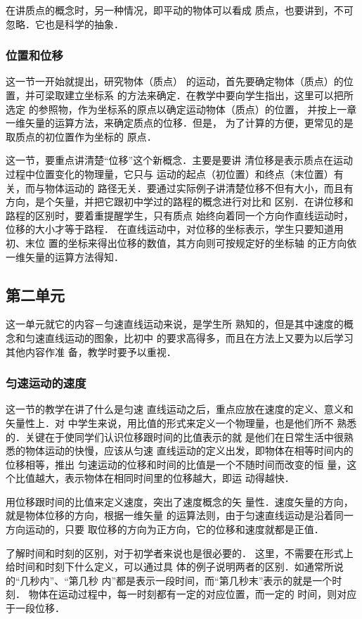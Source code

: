 在讲质点的概念时，另一种情况，即平动的物体可以看成
质点，也要讲到，不可忽略．它也是科学的抽象．

\subsubsection{位置和位移}
 这一节一开始就提出，研究物体（质点）
的运动，首先要确定物体（质点）的位置，并可梁取建立坐标系
的方法来确定．在教学中要向学生指出，这里可以把所选定
的参照物，作为坐标系的原点以确定运动物体（质点）的位置，
并按上一章一维矢量的运算方法，来确定质点的位移．但是，
为了计算的方便，更常见的是取质点的初位置作为坐标的
原点．

这一节，要重点讲清楚“位移”这个新概念．主要是要讲
清位移是表示质点在运动过程中位置变化的物理量，它只与
运动的起点（初位置）和终点（末位置）有关，而与物体运动的
路径无关．要通过实际例子讲清楚位移不但有大小，而且有
方向，是个矢量，并把它跟初中学过的路程的概念进行对比和
区别．在讲位移和路程的区别时，要着重提醒学生，只有质点
始终向着同一个方向作直线运动时，位移的大小才等于路程．
在直线运动中，对位移的坐标表示，学生只要知道用初、末位
置的坐标来得出位移的数值，其方向则可按规定好的坐标轴
的正方向依一维矢量的运算方法得知．

\subsection{第二单元}
这一单元就它的内容－匀速直线运动来说，是学生所
熟知的，但是其中速度的概念和匀速直线运动的图象，比初中
的要求高得多，而且在方法上又要为以后学习其他内容作准
备，教学时要予以重视．

\subsubsection{匀速运动的速度}

这一节的教学在讲了什么是匀速
直线运动之后，重点应放在速度的定义、意义和矢量性上．对
中学生来说，用比值的形式来定义一个物理量，也是他们所不
熟悉的．关键在于使同学们认识位移跟时间的比值表示的就
是他们在日常生活中很熟悉的物体运动的快慢，应该从匀速
直线运动的定义出发，即物体在相等时间内的位移相等，推出
匀速运动的位移和时间的比值是一个不随时间而改变的恒
量，这个比值越大，表示物体在相同时间里的位移越大，即运
动得越快．

用位移跟时间的比值来定义速度，突出了速度概念的矢
量性．速度矢量的方向，就是物体位移的方向，根据一维矢量
的运算法则，由于匀速直线运动是沿着同一方向运动的，只要
取位移的方向为正方向，它的位移和速度就都是正值．

了解时间和时刻的区别，对于初学者来说也是很必要的．
这里，不需要在形式上给时间和时刻下什么定义，可以通过具
体的例子说明两者的区别．如通常所说的“几秒内”、“第几秒
内”都是表示一段时间，而“第几秒末”表示的就是一个时刻．
物体在运动过程中，每一时刻都有一定的对应位置，而一定的
时间，则对应于一段位移．

